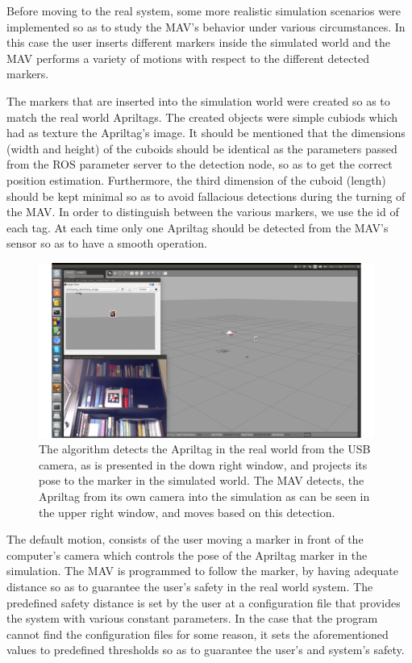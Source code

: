 Before moving to the real system, some more realistic simulation scenarios were implemented so as to study the MAV's behavior under various circumstances. In this case the user inserts different markers inside the simulated world and the MAV performs a variety of motions with respect to the different detected markers.

The markers that are inserted into the simulation world were created so as to match the real world Apriltags. The created objects were simple cubiods which had as texture the Apriltag's image. It should be mentioned that the dimensions (width and height) of the cuboids should be identical as the parameters passed from the ROS parameter server to the detection node, so as to get the correct position estimation. Furthermore, the third dimension of the cuboid (length) should be kept minimal so as to avoid fallacious detections during the turning of the MAV. In order to distinguish between the various markers, we use the id of each tag. At each time only one Apriltag should be detected from the MAV's sensor so as to have a smooth operation.

\begin{figure}
   \centering
   \includegraphics[width=0.98\textwidth]{images/sim_atag_mavdet_win.pdf}
   \caption{The algorithm detects the Apriltag in the real world from the USB camera, as is presented in the down right window, and projects its pose to the marker in the simulated world. The MAV detects, the Apriltag from its own camera into the simulation as can be seen in the upper right window, and moves based on this detection.}
   \label{pics:apriltags_firefly_simulation_screen}
\end{figure}

The default motion, consists of the user moving a marker in front of the computer's camera which controls the pose of the Apriltag marker in the simulation. The MAV is programmed to follow the marker, by having adequate distance so as to guarantee the user's safety in the real world system. The predefined safety distance is set by the user at a configuration file that provides the system with various constant parameters. In the case that the program cannot find the configuration files for some reason, it sets the aforementioned values to predefined thresholds so as to guarantee the user's and system's safety. 

